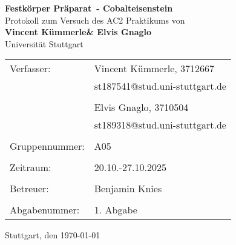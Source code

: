 \documentclass[a4paper,12pt,bibtotocnumbered]{scrartcl}
\makeatletter
\newcommand{\VERSUCHSDATUM}{20.10.-27.10.2025}
\newcommand{\PROTOKOLLDATUM}{\today}
\newcommand{\VerfasserEINS}{Vincent Kümmerle}
\newcommand{\MatNoEINS}{3712667}
\newcommand{\EmailEINS}{st187541@stud.uni-stuttgart.de}
\newcommand{\VerfasserZWEI}{Elvis Gnaglo}
\newcommand{\MatNoZWEI}{3710504}
\newcommand{\EmailZWEI}{st189318@stud.uni-stuttgart.de}
\newcommand{\BETREUER}{Benjamin Knies}
\newcommand{\GRUPPENNR}{A05}
\newcommand{\VERSUCHSNR}{Festkörper Präparat}
\newcommand{\VERSUCHSNAME}{Cobalteisenstein}
\makeatother
\begin{document}
\thispagestyle{empty}


\begin{titlepage}

\begin{center}
\Huge{\textbf{\VERSUCHSNR\ - \VERSUCHSNAME}}\\
\vspace{10mm}%
\Large{Protokoll zum Versuch des AC2 Praktikums von \\ \textbf{\VerfasserEINS\;\& \VerfasserZWEI}}\\
\vspace{10mm} 
\Large{Universität Stuttgart}\\
\end{center}
\vspace{1cm}
\begin{center}
\begin{tabular}{ll}
\large{Verfasser:}		& \large{\VerfasserEINS,} \large{\MatNoEINS} \\
 						& \large{\EmailEINS} \\
 						\vspace{0cm}\\
						& \large{\VerfasserZWEI,} \large{\MatNoZWEI} \\
                        & \large{\EmailZWEI} \\
						\vspace{0cm}\\
\large{Gruppennummer:}	& \large{\GRUPPENNR} \\
\vspace{0cm}\\
\large{Zeitraum:}	& \large{\VERSUCHSDATUM} \\
\vspace{0cm}\\
\large{Betreuer:}		& \large{\BETREUER} \\
\vspace{0cm}\\
\large{Abgabenummer:} & \large{1. Abgabe}
\end{tabular}
\end{center}
\vspace{15mm}

\begin{center}
Stuttgart, den \PROTOKOLLDATUM
\end{center}

\end{titlepage}


\thispagestyle{empty}

\tableofcontents 
\end{document}
